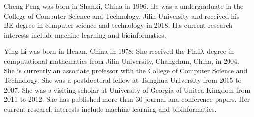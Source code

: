 \documentclass[10pt,journal,compsoc]{IEEEtran}
\begin{document}
\begin{IEEEbiography}{Cheng Peng} 
	was born in Shanxi, China in 1996. He was a undergraduate in the College of Computer Science and Technology, Jilin University and received his BE degree in computer science and technology in 2018. His current research interests include machine learning and bioinformatics.
\end{IEEEbiography}

\begin{IEEEbiography}{Ying Li} 
	was born in Henan, China in 1978. She received the Ph.D. degree in computational mathematics from Jilin University, Changchun, China, in 2004. She is currently an associate professor with the College of Computer Science and Technology. She was a postdoctoral fellow at Tsinghua University from 2005 to 2007. She was a visiting scholar at University of Georgia of United Kingdom from 2011 to 2012. She has published more than 30 journal and conference papers. Her current research interests include machine learning and bioinformatics.
\end{IEEEbiography}
	
\end{document}
